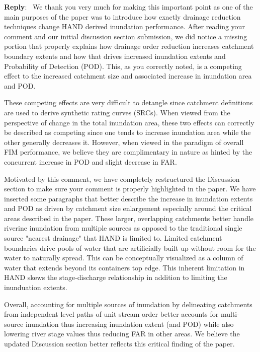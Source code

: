 \documentclass[11pt]{article}
\newcounter{reviewer}
\newcounter{point}[reviewer]
\newenvironment{reply}
   {\medskip \noindent \begin{sf}\textbf{Reply}:\  }
   {\medskip \end{sf}}
\begin{document}
\begin{reply}
We thank you very much for making this important point as one of the main purposes of the paper was to introduce how exactly drainage reduction techniques change HAND derived inundation performance.
After reading your comment and our initial discussion section submission, we did notice a missing portion that properly explains how drainage order reduction increases catchment boundary extents and how that drives increased inundation extents and Probability of Detection (POD).
This, as you correctly noted, is a competing effect to the increased catchment size and associated increase in inundation area and POD.

These competing effects are very difficult to detangle since catchment definitions are used to derive synthetic rating curves (SRCs).
When viewed from the perspective of change in the total inundation area, these two effects can correctly be described as competing since one tends to increase inundation area while the other generally decreases it.
However, when viewed in the paradigm of overall FIM performance, we believe they are complimentary in nature as hinted by the concurrent increase in POD and slight decrease in FAR.

Motivated by this comment, we have completely restructured the Discussion section to make sure your comment is properly highlighted in the paper.
We have inserted some paragraphs that better describe the increase in inundation extents and POD as driven by catchment size enlargement especially around the critical areas described in the paper.
These larger, overlapping catchments better handle riverine inundation from multiple sources as opposed to the traditional single source "nearest drainage" that HAND is limited to.
Limited catchment boundaries drive pools of water that are artificially built up without room for the water to naturally spread. 
This can be conceptually visualized as a column of water that extends beyond its containers top edge.
This inherent limitation in HAND skews the stage-discharge relationship in addition to limiting the inunduation extents.

Overall, accounting for multiple sources of inundation by delineating catchments from independent level paths of unit stream order better accounts for multi-source inundation thus increasing inundation extent (and POD) while also lowering river stage values thus reducing FAR in other areas.
We believe the updated Discussion section better reflects this critical finding of the paper.
\end{reply}
\end{document}
